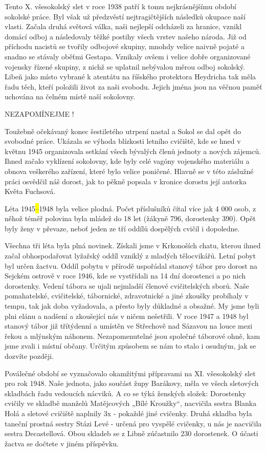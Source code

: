 Tento X. všesokolský slet v roce 1938 patří k tomu nejkrásnějšímu období
sokolské práce. Byl však už předzvěstí nejtragičtějších následků okupace
naší vlasti. Začala druhá světová válka, naši nejlepší odcházeli za
hranice, vznikl domácí odboj a následovaly těžké postihy všech vrstev
našeho národa. Již od příchodu nacistů se tvořily odbojové skupiny,
mnohdy velice naivně pojaté a snadno se stávaly oběťmi Gestapa. Vznikaly
ovšem i velice dobře organizované vojensky řízené skupiny, z nichž se
uplatnil nebývalou měrou odboj sokolský. Libeň jako místo vybrané k
atentátu na říšského protektora Heydricha tak měla řadu těch, kteří
položili život za naši svobodu. Jejich jména jsou na věčnou paměť
uchována na čelném místě naší sokolovny.

NEZAPOMÍNEJME !

Toužebně očekávaný konec šestiletého utrpení nastal a Sokol se dal opět
do svobodné práce. Ukázala se výhoda blízkosti letního cvičiště, kde se
hned v květnu 1945 organizovala setkání všech bývalých členů jednoty a
nových zájemců. Ihned začalo vyklízení sokolovny, kde byly celé vagóny
vojenského materiálu a obnova veškerého zařízení, které bylo velice
poničené. Hlavně se v této záslužné práci osvědčil náš dorost, jak to
pěkně popsala v kronice dorostu její autorka Květa Fuchsová.

Léta 1945\emph{\hl{--}}1948 byla velice plodná. Počet příslušníků čítal
více jak 4 000 osob, z něhož téměř polovina byla mládež do 18 let
(žákyně 796, dorostenky 390). Opět byly ženy v převaze, neboť jeden ze
tří oddílů dospělých cvičil i dopoledne.

Všechna tři léta byla plná novinek. Získali jsme v Krkonoších chatu,
kterou ihned začal obhospodařovat lyžařský oddíl vzniklý z mladých
tělocvikářů. Letní pobyt byl určen žactvu. Oddíl pobytu v přírodě
uspořádal stanový tábor pro dorost na Sejckém ostrově v roce 1946, kde
se vystřídali na 14 dní dorostenci a po nich dorostenky. Vedení tábora
se ujali nejmladší členové cvičitelských sborů. Naše pomahatelské,
cvičitelské, tábornické, zdravotnické a jiné zkoušky probíhaly v tempu,
tak jak doba vyžadovala, a přesto byly důkladné a obsažné. My jsme byli
plni elánu a nadšení a zkoušející nás v ničem nešetřili. V roce 1947 a
1948 byl stanový tábor již třítýdenní a umístěn ve Střechově nad Sázavou
na louce mezi řekou a mlýnským náhonem. Nezapomenutelné jsou společné
táborové ohně, kam jsme zvali i místní občany. Určitým způsobem se nám
to stalo i osudným, jak se dozvíte později.

Poválečné období se vyznačovalo okamžitými přípravami na XI. všesokolský
slet pro rok 1948. Naše jednota, jako součást župy Barákovy, měla ve
všech sletových skladbách řadu vedoucích nácviků. A co se týká ženských
složek: Dorostenky cvičily ve skladbě manželů Matějcových „Bílé
Kroužky``, nacvičila sestra Blanka Holá a sletové cvičiště naplnily 3x -
pokaždé jiné cvičenky. Druhá skladba byla taneční prostná sestry Stázi
Levé - určená pro vyspělé cvičenky, u nás je nacvičila sestra
Decastellová. Obou skladeb se z Libně zúčastnilo 230 dorostenek. O
účasti žactva se dočtete v jiném příspěvku.

